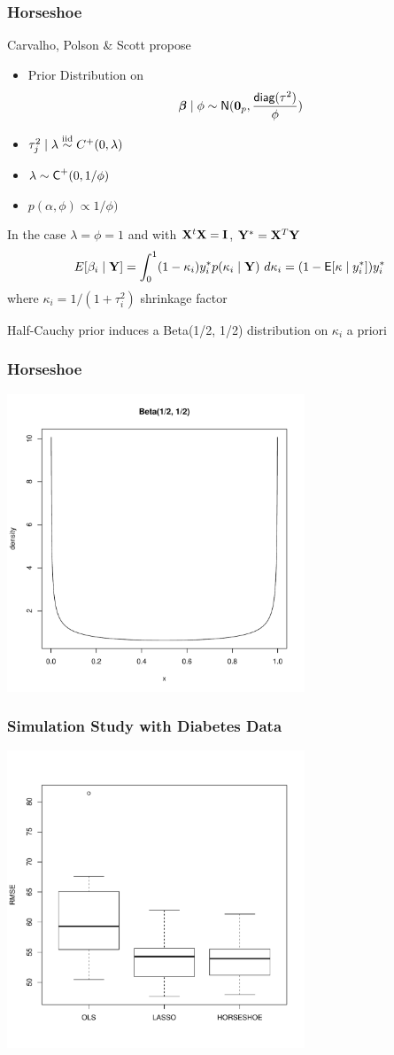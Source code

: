 \documentclass[]{beamer}
\begin{document}
\begin{frame}
  \frametitle{Horseshoe}
  Carvalho, Polson \& Scott  propose
\begin{itemize}
\item
Prior Distribution on $$\boldsymbol{\beta} \mid \phi \sim \textsf{N}(\mathbf{0}_p, \frac{\textsf{diag}(\tau^2)}{ \phi
    }) $$ \pause
\item $\tau_j^2 \mid \lambda \mathrel{\mathop{\sim}\limits^{\rm iid}} C^+(0, \lambda)$ \pause
\item $\lambda \sim \textsf{C}^+(0, 1/\phi)$ \pause
\item $p(\alpha, \phi) \propto 1/\phi)$ \pause
\end{itemize}

In the case $\lambda = \phi = 1$ and with $\mathbf{X}^t\mathbf{X} = \mathbf{I}$, $\mathbf{Y}^* =
\mathbf{X}^T\mathbf{Y}$ \pause
$$
E[\beta_i \mid \mathbf{Y}] = \int_0^1 (1 - \kappa_i) y^*_i p(\kappa_i \mid \mathbf{Y})
\ d\kappa_i = (1 - \textsf{E}[\kappa \mid y^*_i]) y^*_i$$
where $\kappa_i = 1/(1 + \tau_i^2)$ shrinkage factor \pause

\vspace{18pt}
Half-Cauchy prior induces a Beta(1/2, 1/2) distribution on $\kappa_i$
a priori
\end{frame}
\begin{frame}
\frametitle{Horseshoe}
  \includegraphics[height=3.5in]{beta}
\end{frame}



\begin{frame}
  \frametitle{Simulation Study with Diabetes Data}
  \includegraphics[height=3.5in]{diabetes}
\end{frame}
\end{document}

